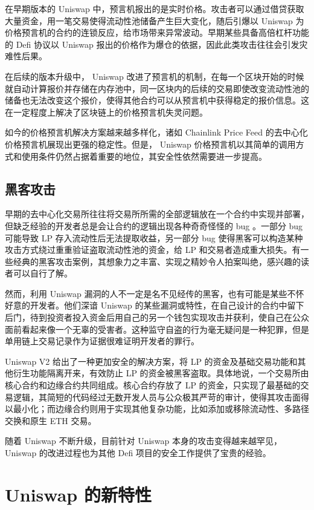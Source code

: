 \documentclass[12pt, a4paper, oneside]{ctexart}
\begin{document}
在早期版本的 Uniswap 中，预言机报出的是实时价格。攻击者可以通过借贷获取大量资金，用一笔交易使得流动性池储备产生巨大变化，随后引爆以 Uniswap 为价格预言机的合约的连锁反应，给市场带来异常波动。早期某些具备高倍杠杆功能的 Defi 协议以 Uniswap 报出的价格作为爆仓的依据，因此此类攻击往往会引发灾难性后果。

在后续的版本升级中， Uniswap 改进了预言机的机制，在每一个区块开始的时候就自动计算报价并存储在内存池中，同一区块内的后续的交易即使改变流动性池的储备也无法改变这个报价，使得其他合约可以从预言机中获得稳定的报价信息。这在一定程度上解决了区块链上的价格预言机失灵问题。

如今的价格预言机解决方案越来越多样化，诸如 Chainlink Price Feed 的去中心化价格预言机展现出更强的稳定性。但是， Uniswap 价格预言机以其简单的调用方式和使用条件仍然占据着重要的地位，其安全性依然需要进一步提高。

\subsection{黑客攻击}

早期的去中心化交易所往往将交易所所需的全部逻辑放在一个合约中实现并部署，但缺乏经验的开发者总是会让合约的逻辑出现各种奇奇怪怪的 bug 。一部分 bug 可能导致 LP 存入流动性后无法提取收益，另一部分 bug 使得黑客可以构造某种攻击方式绕过重重验证盗取流动性池的资金，给 LP 和交易者造成重大损失。有一些经典的黑客攻击案例，其想象力之丰富、实现之精妙令人拍案叫绝，感兴趣的读者可以自行了解。

然而，利用 Uniswap 漏洞的人不一定是名不见经传的黑客，也有可能是某些不怀好意的开发者。他们深谙 Uniswap 的某些漏洞或特性，在自己设计的合约中留下后门，待到投资者投入资金后用自己的另一个钱包实现攻击并获利，使自己在公众面前看起来像一个无辜的受害者。这种监守自盗的行为毫无疑问是一种犯罪，但是单用链上交易记录作为证据很难证明开发者的罪行。

Uniswap V2 给出了一种更加安全的解决方案，将 LP 的资金及基础交易功能和其他衍生功能隔离开来，有效防止 LP 的资金被黑客盗取。具体地说，一个交易所由核心合约和边缘合约共同组成。核心合约存放了 LP 的资金，只实现了最基础的交易逻辑，其简短的代码经过无数开发人员与公众极其严苛的审计，使得其攻击面得以最小化；而边缘合约则用于实现其他复杂功能，比如添加或移除流动性、多路径交换和原生 ETH 交易。

随着 Uniswap 不断升级，目前针对 Uniswap 本身的攻击变得越来越罕见， Uniswap 的改进过程也为其他 Defi 项目的安全工作提供了宝贵的经验。

\section{Uniswap 的新特性}
\end{document}
